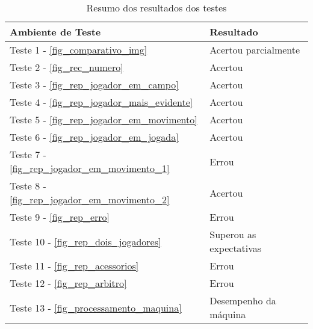 \begin{table}[h]
\centering
\caption{Resumo dos resultados dos testes}
\label{resultado_de_testes}
\begin{tabular}{l|l} 
\hline
\hline
\multicolumn{1}{l|}{\textbf{Ambiente de Teste}} & \multicolumn{1}{l}{\textbf{Resultado}}  \\ 
\hline
\centering
Teste 1 - \autoref{fig_comparativo_img} & Acertou parcialmente\\
Teste 2 - \autoref{fig_rec_numero} & Acertou\\
Teste 3 - \autoref{fig_rep_jogador_em_campo} & Acertou\\
Teste 4 - \autoref{fig_rep_jogador_mais_evidente} & Acertou\\
Teste 5 - \autoref{fig_rep_jogador_em_movimento} & Acertou\\
Teste 6 - \autoref{fig_rep_jogador_em_jogada} & Acertou\\
Teste 7 - \autoref{fig_rep_jogador_em_movimento_1} & Errou\\
Teste 8 - \autoref{fig_rep_jogador_em_movimento_2} & Acertou\\
Teste 9 - \autoref{fig_rep_erro} & Errou\\
Teste 10 - \autoref{fig_rep_dois_jogadores} & Superou as expectativas\\
Teste 11 - \autoref{fig_rep_acessorios} & Errou\\
Teste 12 - \autoref{fig_rep_arbitro} & Errou\\
Teste 13 - \autoref{fig_processamento_maquina} & Desempenho da máquina\\
\hline
\hline
\end{tabular}
\centering {}
\end{table}